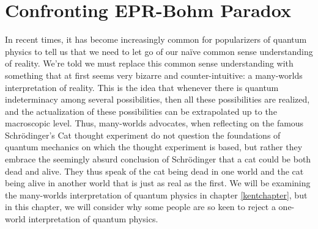 \begin{comment}
    \section{Introduction}
    \emph{}
    
    Common sense is very often underrated. This is especially so in the light of modern physics. Not infrequently, one hears people claim that modern physics shows us that reality is fundamentally weird and that we must discard our naïve common sense intuitions. Now perhaps these people are right, but if we are to accept their claims, they ought to have really compelling reasons. The usual response to an argument that results in weird or seemingly absurd conclusions is to question the argument's premises or examine whether the argument is logically valid. 
\end{comment}
    \chapter{Confronting EPR-Bohm Paradox\label{BellChapter}}
    In recent times, it has become increasingly common for popularizers of quantum physics to tell us that we need to let go of our naïve common sense understanding of reality. We're told we must replace this common sense understanding with something that at first seems very bizarre and counter-intuitive: a many-worlds interpretation of reality. This is the idea that whenever there is quantum indeterminacy among several possibilities, then all these possibilities are realized, and the actualization of these possibilities can be extrapolated up to the macroscopic level. Thus, many-worlds advocates, when reflecting on the famous Schr\"{o}dinger's Cat thought experiment do not question the foundations of quantum mechanics on which the thought experiment is based, but rather they embrace the seemingly absurd conclusion of Schr\"{o}dinger that a cat could be both dead and alive. They thus speak of the cat being dead in one world and the cat being alive in another world that is just as real as the first. We will be examining the many-worlds interpretation of quantum physics in chapter \ref{kentchapter}, but in this chapter, we will consider why some people are so keen to reject a one-world interpretation of quantum physics.
    
